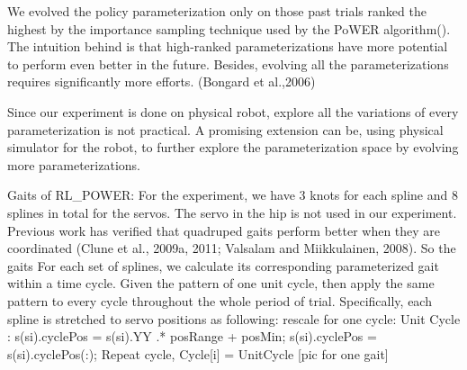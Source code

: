 We evolved the policy parameterization only on those past trials ranked the highest by the importance sampling technique used by the PoWER algorithm(). The intuition behind is that high-ranked parameterizations have more potential to perform even better in the future. Besides, evolving all the parameterizations requires significantly more efforts. (Bongard et al.,2006) 

Since our experiment is done on physical robot, explore all the variations of every parameterization is not practical. A promising extension can be, using physical simulator for the robot, to further explore the parameterization space by evolving more parameterizations. 

Gaits of RL_POWER:
For the experiment, we have 3 knots for each spline and 8 splines in total for the servos. The servo in the hip is not used in our experiment. Previous work has verified that quadruped gaits perform better when they are coordinated (Clune et al., 2009a, 2011; Valsalam and Miikkulainen, 2008). So the gaits For each set of splines, we calculate its corresponding parameterized gait within a time cycle. Given the pattern of one unit cycle, then apply the same pattern to every cycle throughout the whole period of trial. 
Specifically, each spline is stretched to servo positions as following:
   rescale for one cycle:
 	Unit Cycle :
s(si).cyclePos = s(si).YY .* posRange + posMin;
    		s(si).cyclePos = s(si).cyclePos(:);
    	Repeat cycle,  
    	Cycle[i] = UnitCycle
[pic for one gait]
